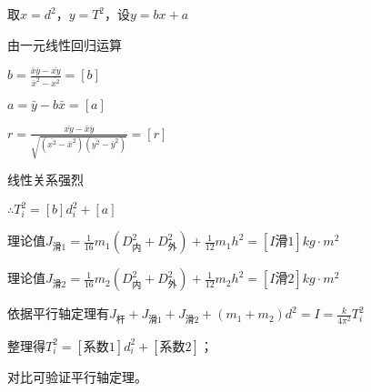 \documentclass[11pt,a4paper,oneside]{article}
\begin{document}
取$x = d^2$，$y = T^2$，设$y = bx+a$

由一元线性回归运算

$b= \displaystyle\frac{\bar{x}\bar{y}- \bar{xy}}{\bar{x}^2-\bar{x^2}}=[b]$

$a = \bar{y} - b\bar{x} = [a]$

$r = \displaystyle\frac{\bar{xy}- \bar{x}\bar{y}}{\sqrt{(\bar{x^2}-\bar{x}^2)(\bar{y^2}-\bar{y}^2)}} = [r]$

线性关系强烈

$\therefore T_i^2 = [b]d_i^2+[a]$

理论值$J_{滑1} = \displaystyle\frac{1}{16}m_1(D_内^2+D_外^2) + \displaystyle\frac{1}{12}m_1h^2 = [I滑1]kg\cdot m^2$

理论值$J_{滑2} = \displaystyle\frac{1}{16}m_2(D_内^2+D_外^2) + \displaystyle\frac{1}{12}m_2h^2 = [I滑2]kg\cdot m^2$

依据平行轴定理有$J_杆 + J_{滑1} +J_{滑2} + (m_1 + m_2)d^2 = I = \displaystyle\frac{k}{4\pi ^2}T_i^2$

整理得$T_i^2 = [系数1]d_i^2 + [系数2]$；

对比可验证平行轴定理。
\end{document}
